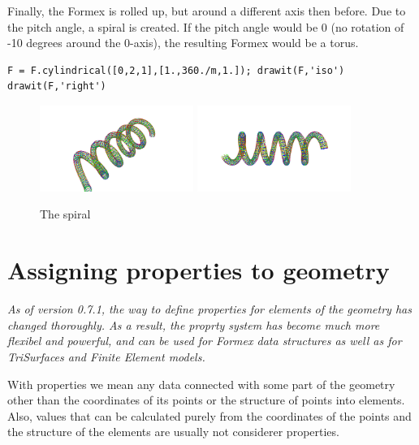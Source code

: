 Finally, the Formex is rolled up, but around a different axis then before. 
Due to the pitch angle, a spiral is created. If the pitch angle would be 0 
(no rotation of -10 degrees around the 0-axis), the resulting Formex 
would be a torus. 
\begin{verbatim}
F = F.cylindrical([0,2,1],[1.,360./m,1.]); drawit(F,'iso')
drawit(F,'right')
\end{verbatim}
 \begin{figure}[ht]
   \centering
   \begin{makeimage}
   \end{makeimage}
   \begin{latexonly}
     \includegraphics[width=5cm]{images/spiral-007}
     \includegraphics[width=5cm]{images/spiral-008}
   \end{latexonly}
   \begin{htmlonly}
   \end{htmlonly}  
   \caption{The spiral}
 \end{figure}

\section{Assigning properties to geometry}
\label{sec:props}
\emph{As of version 0.7.1, the way to define properties for elements of the geometry has changed thoroughly. As a result, the proprty system has become much more flexibel and powerful, and can be used for Formex data structures as well as for TriSurfaces and Finite Element models.}

With properties we mean any data connected with some part of the geometry other than the coordinates of its points or the structure of points into elements.
Also, values that can be calculated purely from the coordinates of the points and the structure of the elements are usually not considerer properties.

